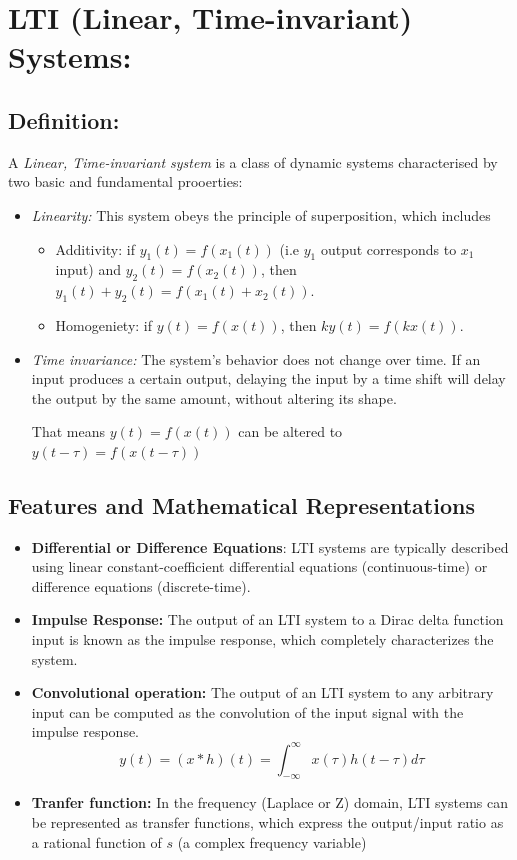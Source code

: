 \documentclass{report}
\begin{document}
\section{LTI (Linear, Time-invariant) Systems:}
\subsection{Definition:}
A \textit{Linear, Time-invariant system} is a class of dynamic systems characterised by two basic and fundamental prooerties:
\begin{itemize}
    \item \textit{Linearity:} This system obeys the principle of superposition, which includes
    \begin{itemize}
        \item Additivity: if $y_1(t)=f(x_1(t))$ (i.e $y_1$ output corresponds to $x_1$ input) and $y_2(t)=f(x_2(t))$, then $y_1(t)+y_2(t)=f(x_1(t)+x_2(t))$.
        \item Homogeniety: if $y(t)=f(x(t))$, then $ky(t)=f(kx(t))$.
    \end{itemize}
    \item \textit{Time invariance:} The system's behavior does not change over time. If an input produces a certain output, delaying the input by a time shift will delay the output by the same amount, without altering its shape.
    \\
    \par
    That means $y(t)=f(x(t))$ can be altered to $y(t-\tau)=f(x(t-\tau))$
\end{itemize}

\subsection{Features and Mathematical Representations}
\begin{itemize}
    \item \textbf{Differential or Difference Equations}: LTI systems are typically described using linear constant-coefficient differential equations (continuous-time) or difference equations (discrete-time).
    \item \textbf{Impulse Response:} The output of an LTI system to a Dirac delta function input is known as the impulse response, which completely characterizes the system.
    \item \textbf{Convolutional operation:} The output of an LTI system to any arbitrary input can be computed as the convolution of the input signal with the impulse response.
    \\
    \begin{equation}
        y(t) = (x * h)(t) = \int_{-\infty}^{\infty} x(\tau) h(t - \tau) d\tau
    \end{equation}
    \item \textbf{Tranfer function:} In the frequency (Laplace or Z) domain, LTI systems can be represented as transfer functions, which express the output/input ratio as a rational function of $s$ (a complex frequency variable)
\end{itemize}
\end{document}
